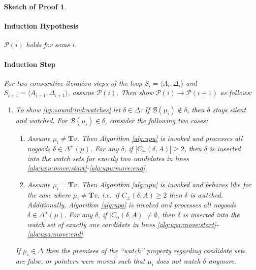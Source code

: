 \documentclass{vutinfth} %
\newtheorem{proof-sketch}{Sketch of Proof}[chapter]
\newcommand{\bpro}{\mathcal{B}}
\newcommand{\ass}{A}
\newcommand{\bT}{\mathbf{T}}
\newcommand{\cdpm}{C_\pm}
\newcommand{\cdal}{C_\alpha}
\newcommand{\dpm}{\Delta^\pm}
\newcommand{\dal}{\Delta^\alpha}
\newcommand{\sgl}{\mu}
\begin{document}
\begin{proof-sketch}
\paragraph{Induction Hypothesis} $\mathcal{P}(i)$ holds for some $i$.

\paragraph{Induction Step} For two consecutive iteration steps of the loop $S_{i} = \langle \ass_{i}, \Delta_{i} \rangle$ and $S_{i+1} = \langle \ass_{i+1}, \Delta_{i+1} \rangle$, assume $\mathcal{P}(i)$. Then show $\mathcal{P}(i) \to \mathcal{P}(i + 1)$ as follows:%

\begin{enumerate}
\item To show \ref{up:sound:ind:watches} let $\delta \in \Delta$: %
If $\bpro(\sgl_i) \not \in \delta$, then $\delta$ stays silent and watched. For $\bpro(\sgl_i) \in \delta$, consider the following two cases:
\begin{enumerate}
	\item Assume $\sgl_i \not = \bT v$. Then Algorithm \ref{alg:upu} is invoked and processes all nogoods $\delta \in \dpm(\sgl)$. For any $\delta$, if $|\cdpm(\delta, A)| \geq 2$, then $\delta$ is inserted into the watch sets for exactly two candidates in lines \ref{alg:upu:move:start}-\ref{alg:upu:move:end}.
	\item Assume $\sgl_i = \bT v$. Then Algorithm \ref{alg:upu} is invoked and behaves like for the case where $\sgl_i \not = \bT v$, i.e.~if $\cdpm(\delta,\ass) \geq 2$ then $\delta$ is watched. Additionally, Algorithm \ref{alg:upa} is invoked and processes all nogoods $\delta \in \dal(\sgl)$. For any $\delta$, if $|\cdal(\delta, A)| \not = \emptyset$, then $\delta$ is inserted into the watch set of exactly one candidate in lines \ref{alg:upa:move:start}-\ref{alg:upa:move:end}. 
\end{enumerate}

If $\sgl_i \in \Delta$ then the premises of the \enquote{watch} property regarding candidate sets are false, or pointers were moved such that $\sgl_i$ does not watch $\delta$ anymore.


\end{enumerate}
\end{proof-sketch}
\end{document}
